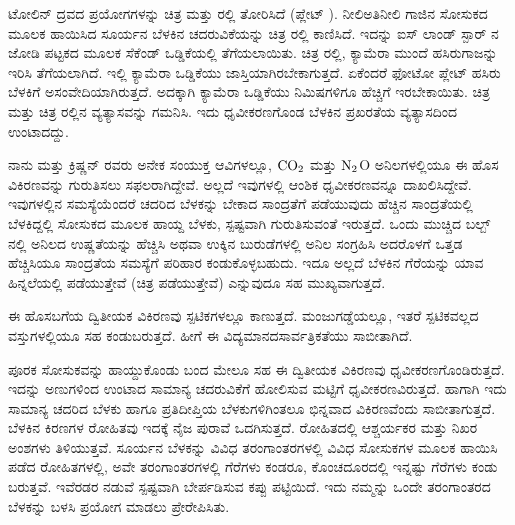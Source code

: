 ಟೋಲಿನ್ ದ್ರವದ ಪ್ರಯೋಗಗಳನ್ನು ಚಿತ್ರ  ಮತ್ತು ರಲ್ಲಿ ತೋರಿಸಿದೆ (ಪ್ಲೇಟ್ ). ನೀಲಿ\enginline{-}ಅತಿನೀಲಿ ಗಾಜಿನ ಸೋಸುಕದ ಮೂಲಕ ಹಾಯಿಸಿದ ಸೂರ್ಯನ ಬೆಳಕಿನ ಚದರುವಿಕೆಯನ್ನು ಚಿತ್ರ ರಲ್ಲಿ ಕಾಣಿಸಿದೆ. ಇದನ್ನು ಐಸ್ ಲಾಂಡ್ ಸ್ಪಾರ್ ನ ಜೋಡಿ ಪಟ್ಟಕದ ಮೂಲಕ  ಸೆಕೆಂಡ್ ಒಡ್ಡಿಕೆಯಲ್ಲಿ ತೆಗೆಯಲಾಯಿತು. ಚಿತ್ರ ರಲ್ಲಿ, ಕ್ಯಾಮೆರಾ ಮುಂದೆ ಹಸಿರುಗಾಜನ್ನು ಇರಿಸಿ ತೆಗೆಯಲಾಗಿದೆ. ಇಲ್ಲಿ ಕ್ಯಾಮೆರಾ ಒಡ್ಡಿಕೆಯು ಜಾಸ್ತಿಯಾಗಿರಬೇಕಾಗುತ್ತದೆ. ಏಕೆಂದರೆ ಫೋಟೋ ಪ್ಲೇಟ್ ಹಸಿರು ಬೆಳಕಿಗೆ ಅಸಂವೇದಿಯಾಗಿರುತ್ತದೆ. ಅದಕ್ಕಾಗಿ ಕ್ಯಾಮೆರಾ ಒಡ್ಡಿಕೆಯು  ನಿಮಿಷಗಳಿಗೂ ಹೆಚ್ಚಿಗೆ ಇರಬೇಕಾಯಿತು. ಚಿತ್ರ  ಮತ್ತು ಚಿತ್ರ ರಲ್ಲಿನ ವ್ಯತ್ಯಾಸವನ್ನು ಗಮನಿಸಿ. ಇದು ಧೃವೀಕರಣಗೊಂಡ ಬೆಳಕಿನ ಪ್ರಖರತೆಯ ವ್ಯತ್ಯಾಸದಿಂದ ಉಂಟಾದದ್ದು.

ನಾನು ಮತ್ತು ಕ್ರಿಷ್ಣನ್ ರವರು ಅನೇಕ ಸಂಯುಕ್ತ ಆವಿಗಳಲ್ಲೂ, ${\rm CO}_2$ ಮತ್ತು ${\rm N}_2${\rm O} ಅನಿಲಗಳಲ್ಲಿಯೂ ಈ ಹೊಸ ವಿಕಿರಣವನ್ನು ಗುರುತಿಸಲು ಸಫಲರಾಗಿದ್ದೇವೆ. ಅಲ್ಲದೆ ಇವುಗಳಲ್ಲಿ ಆಂಶಿಕ ಧೃವೀಕರಣವನ್ನೂ ದಾಖಲಿಸಿದ್ದೇವೆ. ಇವುಗಳಲ್ಲಿನ ಸಮಸ್ಯೆಯೆಂದರೆ ಚದರಿದ ಬೆಳಕನ್ನು ಬೇಕಾದ ಸಾಂದ್ರತೆಗೆ ಪಡೆಯುವುದು ಹೆಚ್ಚಿನ ಸಾಂದ್ರತೆಯಲ್ಲಿ ಬೆಳಕಿದ್ದಲ್ಲಿ ಸೋಸುಕದ ಮೂಲಕ ಹಾಯ್ದ ಬೆಳಕು, ಸ್ಪಷ್ಟವಾಗಿ ಗುರುತಿಸುವಂತೆ ಇರುತ್ತದೆ. ಒಂದು ಮುಚ್ಚಿದ ಬಲ್ಬ್ ನಲ್ಲಿ ಅನಿಲದ ಉಷ್ಣತೆಯನ್ನು ಹೆಚ್ಚಿಸಿ ಅಥವಾ ಉಕ್ಕಿನ ಬುರುಡೆಗಳಲ್ಲಿ ಅನಿಲ ಸಂಗ್ರಹಿಸಿ ಅದರೊಳಗೆ ಒತ್ತಡ ಹೆಚ್ಚಿಸಿಯೂ ಸಾಂದ್ರತೆಯ ಸಮಸ್ಯೆಗೆ ಪರಿಹಾರ ಕಂಡುಕೊಳ್ಳಬಹುದು. ಇದೂ ಅಲ್ಲದೆ ಬೆಳಕಿನ ಗೆರೆಯನ್ನು ಯಾವ ಹಿನ್ನಲೆಯಲ್ಲಿ ಪಡೆಯುತ್ತೇವೆ (ಚಿತ್ರ ಪಡೆಯುತ್ತೇವೆ) ಎನ್ನುವುದೂ ಸಹ ಮುಖ್ಯವಾಗುತ್ತದೆ.

\newpage

ಈ ಹೊಸಬಗೆಯ ದ್ವಿತೀಯಕ ವಿಕಿರಣವು ಸ್ಪಟಿಕಗಳಲ್ಲೂ ಕಾಣುತ್ತದೆ. ಮಂಜುಗಡ್ಡೆಯಲ್ಲೂ, ಇತರೆ ಸ್ಪಟಿಕವಲ್ಲದ ವಸ್ತುಗಳಲ್ಲಿಯೂ ಸಹ ಕಂಡುಬರುತ್ತದೆ. ಹೀಗೆ ಈ ವಿದ್ಯಮಾನದ\break ಸಾರ್ವತ್ರಿಕತೆಯು ಸಾಬೀತಾಗಿದೆ.



ಪೂರಕ ಸೋಸುಕವನ್ನು ಹಾಯ್ದುಕೊಂಡು ಬಂದ ಮೇಲೂ ಸಹ ಈ ದ್ವಿತೀಯಕ ವಿಕಿರಣವು ಧೃವೀಕರಣಗೊಂಡಿರುತ್ತದೆ. ಇದನ್ನು ಅಣುಗಳಿಂದ ಉಂಟಾದ ಸಾಮಾನ್ಯ ಚದರುವಿಕೆಗೆ ಹೋಲಿಸುವ ಮಟ್ಟಿಗೆ ಧೃವೀಕರಣವಿರುತ್ತದೆ. ಹಾಗಾಗಿ ಇದು ಸಾಮಾನ್ಯ ಚದರಿದ ಬೆಳಕು ಹಾಗೂ ಪ್ರತಿದೀಪ್ತಿಯ ಬೆಳಕುಗಳಿಗಿಂತಲೂ ಭಿನ್ನವಾದ ವಿಕಿರಣವೆಂದು ಸಾಬೀತಾಗುತ್ತದೆ. ಬೆಳಕಿನ ಕಿರಣಗಳ ರೋಹಿತವು ಇದಕ್ಕೆ ನೈಜ ಪುರಾವೆ ಒದಗಿಸುತ್ತದೆ. ರೋಹಿತದಲ್ಲಿ ಆಶ್ಚರ್ಯಕರ ಮತ್ತು ನಿಖರ ಅಂಶಗಳು ತಿಳಿಯುತ್ತವೆ. ಸೂರ್ಯನ ಬೆಳಕನ್ನು ವಿವಿಧ ತರಂಗಾಂತರಗಳಲ್ಲಿ ವಿವಿಧ ಸೋಸುಕಗಳ ಮೂಲಕ ಹಾಯಿಸಿ ಪಡೆದ ರೋಹಿತಗಳಲ್ಲಿ, ಅವೇ ತರಂಗಾಂತರಗಳಲ್ಲಿ ಗೆರೆಗಳು ಕಂಡರೂ, ಕೊಂಚದೂರದಲ್ಲಿ ಇನ್ನಷ್ಟು ಗೆರೆಗಳು ಕಂಡು ಬರುತ್ತವೆ. ಇವೆರಡರ ನಡುವೆ ಸ್ಪಷ್ಟವಾಗಿ ಬೇರ್ಪಡಿಸುವ ಕಪ್ಪು ಪಟ್ಟಿಯಿದೆ. ಇದು ನಮ್ಮನ್ನು ಒಂದೇ ತರಂಗಾಂತರದ ಬೆಳಕನ್ನು ಬಳಸಿ ಪ್ರಯೋಗ ಮಾಡಲು ಪ್ರೇರೇಪಿಸಿತು.

